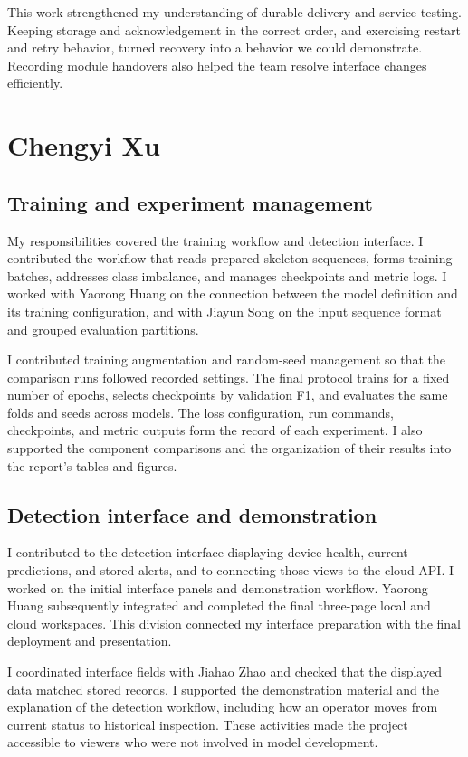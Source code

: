 \documentclass[conference,a4paper]{IEEEtran}
\begin{document}
This work strengthened my understanding of durable delivery and service testing. Keeping storage and acknowledgement in the correct order, and exercising restart and retry behavior, turned recovery into a behavior we could demonstrate. Recording module handovers also helped the team resolve interface changes efficiently.

\section{Chengyi Xu}
\subsection{Training and experiment management}

My responsibilities covered the training workflow and detection interface. I contributed the workflow that reads prepared skeleton sequences, forms training batches, addresses class imbalance, and manages checkpoints and metric logs. I worked with Yaorong Huang on the connection between the model definition and its training configuration, and with Jiayun Song on the input sequence format and grouped evaluation partitions.

I contributed training augmentation and random-seed management so that the comparison runs followed recorded settings. The final protocol trains for a fixed number of epochs, selects checkpoints by validation F1, and evaluates the same folds and seeds across models. The loss configuration, run commands, checkpoints, and metric outputs form the record of each experiment. I also supported the component comparisons and the organization of their results into the report's tables and figures.

\subsection{Detection interface and demonstration}

I contributed to the detection interface displaying device health, current predictions, and stored alerts, and to connecting those views to the cloud API. I worked on the initial interface panels and demonstration workflow. Yaorong Huang subsequently integrated and completed the final three-page local and cloud workspaces. This division connected my interface preparation with the final deployment and presentation.

I coordinated interface fields with Jiahao Zhao and checked that the displayed data matched stored records. I supported the demonstration material and the explanation of the detection workflow, including how an operator moves from current status to historical inspection. These activities made the project accessible to viewers who were not involved in model development.
\end{document}
